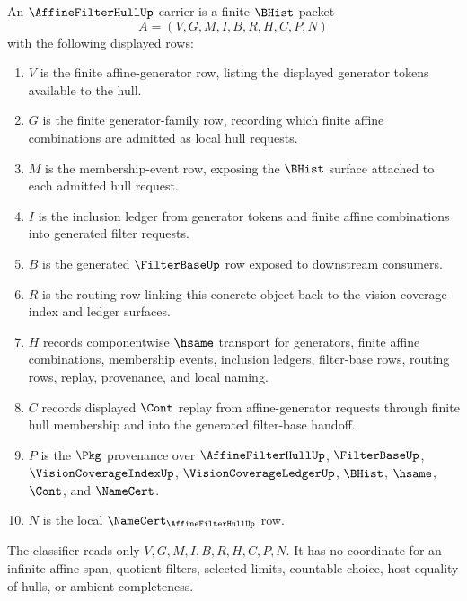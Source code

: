 \begin{definition}
\label{def:affine-filter-hull-carrier}
An $\AffineFilterHullUp$ carrier is a finite $\BHist$ packet
$$
A=(V,G,M,I,B,R,H,C,P,N)
$$
with the following displayed rows:
\begin{enumerate}
\item $V$ is the finite affine-generator row, listing the displayed generator tokens available to the hull.
\item $G$ is the finite generator-family row, recording which finite affine combinations are admitted as local hull requests.
\item $M$ is the membership-event row, exposing the $\BHist$ surface attached to each admitted hull request.
\item $I$ is the inclusion ledger from generator tokens and finite affine combinations into generated filter requests.
\item $B$ is the generated $\FilterBaseUp$ row exposed to downstream consumers.
\item $R$ is the routing row linking this concrete object back to the vision coverage index and ledger surfaces.
\item $H$ records componentwise $\hsame$ transport for generators, finite affine combinations, membership events, inclusion ledgers, filter-base rows, routing rows, replay, provenance, and local naming.
\item $C$ records displayed $\Cont$ replay from affine-generator requests through finite hull membership and into the generated filter-base handoff.
\item $P$ is the $\Pkg$ provenance over $\AffineFilterHullUp$, $\FilterBaseUp$, $\VisionCoverageIndexUp$, $\VisionCoverageLedgerUp$, $\BHist$, $\hsame$, $\Cont$, and $\NameCert$.
\item $N$ is the local $\NameCert_{\AffineFilterHullUp}$ row.
\end{enumerate}
The classifier reads only $V,G,M,I,B,R,H,C,P,N$. It has no coordinate for an infinite affine span, quotient filters, selected limits, countable choice, host equality of hulls, or ambient completeness.
\end{definition}

